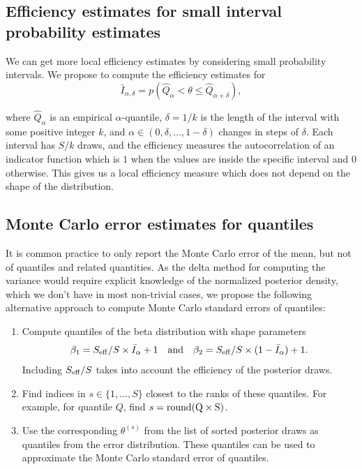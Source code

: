 \documentclass[american,]{article}
\begin{document}
\hypertarget{small_interval_S_eff}{%
\subsection{Efficiency estimates for small interval probability
estimates}\label{small_interval_S_eff}}

We can get more local efficiency estimates by considering small
probability intervals. We propose to compute the efficiency estimates
for
\begin{equation}
\bar{I}_{\alpha,\delta} = p(\hat{Q}_\alpha < \theta \leq \hat{Q}_{\alpha+\delta}),
\end{equation}

where \(\hat{Q}_\alpha\) is an empirical \(\alpha\)-quantile,
\(\delta=1/k\) is the length of the interval with some positive integer
\(k\), and \(\alpha \in (0,\delta,\ldots,1-\delta)\) changes in steps of
\(\delta\). Each interval has \(S/k\) draws, and the efficiency measures
the autocorrelation of an indicator function which is \(1\) when the
values are inside the specific interval and \(0\) otherwise. This gives
us a local efficiency measure which does not depend on the shape of the
distribution.

\hypertarget{mcse}{%
\subsection{Monte Carlo error estimates for quantiles}\label{mcse}}

It is common practice to only report the Monte Carlo error of the mean,
but not of quantiles and related quantities. As the delta method for
computing the variance would require explicit knowledge of the
normalized posterior density, which we don't have in most non-trivial
cases, we propose the following alternative approach to compute Monte
Carlo standard errors of quantiles:

\begin{enumerate}
\def\labelenumi{\arabic{enumi}.}
\item
  Compute quantiles of the beta distribution with shape parameters
  \begin{equation}
  \beta_1 = S_{\rm eff} / S \times \bar{I}_\alpha+1 \quad \text{and} \quad
  \beta_2 = S_{\rm eff} / S \times (1-\bar{I}_\alpha) + 1.
  \end{equation} Including \(S_{\rm eff}/S\) takes into account the
  efficiency of the posterior draws.
\item
  Find indices in \(s \in \{1,\ldots,S\}\) closest to the ranks of these
  quantiles. For example, for quantile \(Q\), find
  \(s = {\rm round(Q \times S)}\).
\item
  Use the corresponding \(\theta^{(s)}\) from the list of sorted
  posterior draws as quantiles from the error distribution. These
  quantiles can be used to approximate the Monte Carlo standard error of quantiles.
\end{enumerate}
\end{document}
